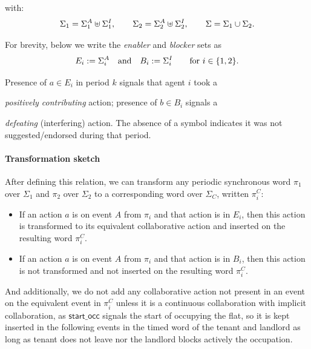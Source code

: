 with:
\[
\Sigma_{1}=\Sigma^{A}_{1}\uplus\Sigma^{I}_{1},\qquad
\Sigma_{2}=\Sigma^{A}_{2}\uplus\Sigma^{I}_{2},\qquad
\Sigma=\Sigma_{1}\cup\Sigma_{2}.
\]



For brevity, below we write the \emph{enabler} and \emph{blocker} sets as
\[
E_i:=\Sigma^{A}_{i}\quad\text{and}\quad B_i:=\Sigma^{I}_{i}\qquad \text{for } i\in\{1,2\}.
\]

Presence of \(a\in E_i\) in period \(k\) signals that agent \(i\) took a

\emph{positively contributing} action; presence of \(b\in B_i\) signals a

\emph{defeating} (interfering) action. The absence of a symbol indicates it was not suggested/endorsed during that period.

\paragraph{Transformation sketch} After defining this relation, we can transform any periodic synchronous word  $\pi_1$ over $\Sigma_1$ and $\pi_2$ over  $\Sigma_2$ to a corresponding word over $\Sigma_C$, written $\pi_i^C$:

\begin{itemize}

\item If an action $a$ is on event $A$ from $\pi_i$ and that action is in $E_i$, then this action is transformed to its equivalent collaborative action and inserted on the resulting word $\pi_i^C$.

\item If an action $a$ is on event $A$ from $\pi_i$ and that action is in $B_i$, then this action is not transformed and not inserted on the resulting word $\pi_i^C$.

\end{itemize}

And additionally, we do not add any collaborative action not present in an event on the equivalent event in $\pi_i^C$ unless it is a continuous collaboration with implicit collaboration, as $\textsf{start\_occ}$ signals the start of occupying the flat, so it is kept inserted in the following events in the timed word of the tenant and landlord as long as tenant does not leave nor the landlord blocks actively the occupation.







